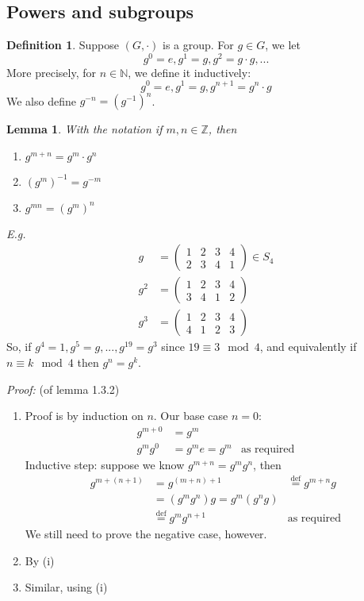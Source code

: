 \documentclass{report}
\newtheorem{lemma}[theorem]{Lemma}
\theoremstyle{remark}
\theoremstyle{definition}
\newtheorem{definition}[theorem]{Definition}
\theoremstyle{definition}
\theoremstyle{theorem}
\begin{document}
\subsection{Powers and subgroups}
\begin{definition}
Suppose $(G,\cdot)$ is a group. For $g \in G$, we let
\[g^0=e, g^1=g, g^2=g \cdot g,...\]
More precisely, for $n \in \mathbb{N}$, we define it inductively:
\[g^0=e, g^1=g, g^{n+1}=g^n\cdot g\]
We also define $g^{-n}=(g^{-1})^n$.
\end{definition}
\begin{lemma}
With the notation if $m, n \in \mathbb{Z}$, then
\begin{enumerate}[label=(\roman*)]
    \item $g^{m+n}=g^m\cdot g^n$
    \item $(g^m)^{-1}=g^{-m}$
    \item $g^{mn}=(g^m)^n$
\end{enumerate}
\end{lemma}
\emph{E.g.} 
\begin{align*}
    g&=\begin{pmatrix}
    1&2&3&4\\
    2&3&4&1
    \end{pmatrix} \in S_4\\
    g^2&=\begin{pmatrix}
    1&2&3&4\\
    3&4&1&2
    \end{pmatrix}\\
    g^3&= \begin{pmatrix}
    1&2&3&4\\
    4&1&2&3
    \end{pmatrix}
\end{align*}
So, if $g^4=1, g^5=g,...,g^{19}=g^3$ since $19 \equiv 3 \mod 4$, and equivalently if $n \equiv k \mod 4$ then $g^n=g^k$.
\par
\emph{Proof:} (of lemma 1.3.2)
\begin{enumerate}[label=(\roman*)]
    \item Proof is by induction on $n$. Our base case $n=0$:
    \begin{align*}
        g^{m+0}&=g^m\\
        g^mg^0&=g^me=g^m & \text{as required}
    \end{align*}
    Inductive step: suppose we know $g^{m+n}=g^mg^n$, then
    \begin{align*}
        g^{m+(n+1)}&=g^{(m+n)+1}
        &\overset{\text{def}}{=} g^{m+n}g\\
        &=(g^mg^n)g=g^m(g^ng)\\
        &\overset{\text{def}}{=}g^mg^{n+1}&\text{as required}
    \end{align*}
    We still need to prove the negative case, however.
    \item By (i)
    \item Similar, using (i)
\end{enumerate}
\end{document}
